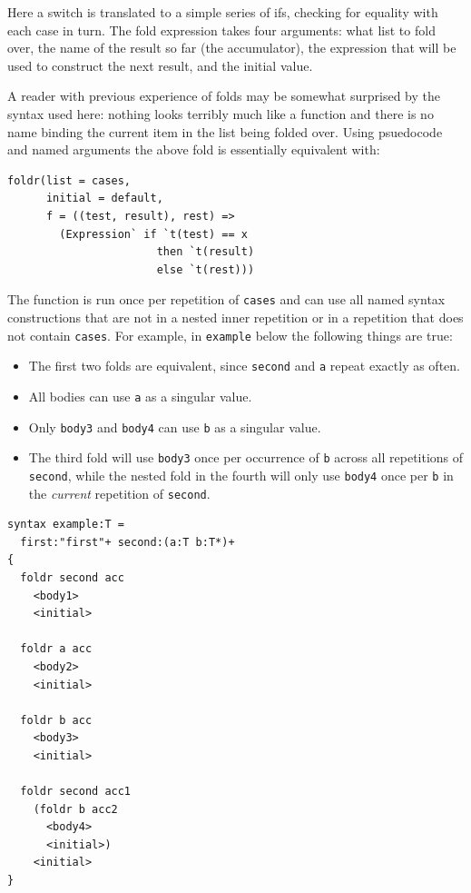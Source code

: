 \documentclass{kththesis}
\begin{document}
Here a switch is translated to a simple series of ifs, checking for equality with each case in turn. The fold expression takes four arguments: what list to fold over, the name of the result so far (the accumulator), the expression that will be used to construct the next result, and the initial value.

A reader with previous experience of folds may be somewhat surprised by the syntax used here: nothing looks terribly much like a function and there is no name binding the current item in the list being folded over. Using psuedocode and named arguments the above fold is essentially equivalent with:

\begin{verbatim}
foldr(list = cases,
      initial = default,
      f = ((test, result), rest) =>
        (Expression` if `t(test) == x
                       then `t(result)
                       else `t(rest)))
\end{verbatim}

The function is run once per repetition of \texttt{cases} and can use all named syntax constructions that are not in a nested inner repetition or in a repetition that does not contain \texttt{cases}. For example, in \texttt{example} below the following things are true:
\begin{itemize}
  \item The first two folds are equivalent, since \texttt{second} and \texttt{a} repeat exactly as often.
  \item All bodies can use \texttt{a} as a singular value.
  \item Only \texttt{body3} and \texttt{body4} can use \texttt{b} as a singular value.
  \item The third fold will use \texttt{body3} once per occurrence of \texttt{b} across all repetitions of \texttt{second}, while the nested fold in the fourth will only use \texttt{body4} once per \texttt{b} in the \emph{current} repetition of \texttt{second}.
\end{itemize}

\begin{verbatim}
syntax example:T =
  first:"first"+ second:(a:T b:T*)+
{
  foldr second acc
    <body1>
    <initial>

  foldr a acc
    <body2>
    <initial>

  foldr b acc
    <body3>
    <initial>

  foldr second acc1
    (foldr b acc2
      <body4>
      <initial>)
    <initial>
}
\end{verbatim}
\end{document}
